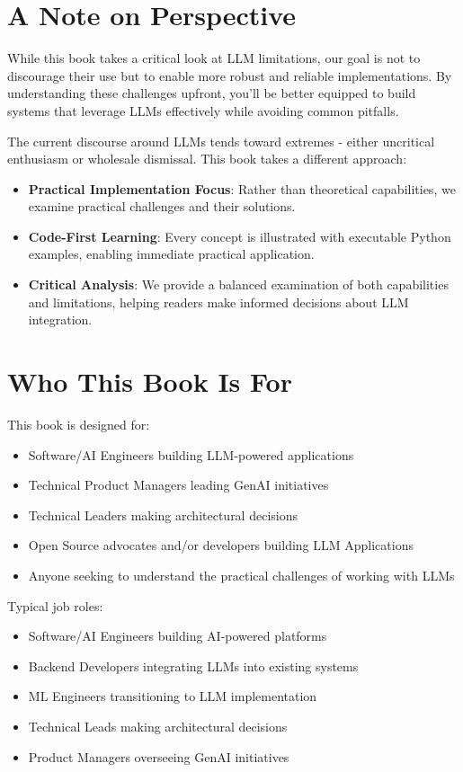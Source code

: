\section{A Note on Perspective}

While this book takes a critical look at LLM limitations, our goal is not to discourage their use but to enable more robust and reliable implementations. By understanding these challenges upfront, you'll be better equipped to build systems that leverage LLMs effectively while avoiding common pitfalls.

The current discourse around LLMs tends toward extremes - either uncritical enthusiasm or wholesale dismissal. This book takes a different approach:

\begin{itemize}
    \item \textbf{Practical Implementation Focus}: Rather than theoretical capabilities, we examine practical challenges and their solutions.
    \item \textbf{Code-First Learning}: Every concept is illustrated with executable Python examples, enabling immediate practical application.
    \item \textbf{Critical Analysis}: We provide a balanced examination of both capabilities and limitations, helping readers make informed decisions about LLM integration.
\end{itemize}

\section{Who This Book Is For}

This book is designed for: 

\begin{itemize}
    \item Software/AI Engineers building LLM-powered applications 
    \item Technical Product Managers leading GenAI initiatives 
    \item Technical Leaders making architectural decisions
    \item Open Source advocates and/or developers building LLM Applications 
    \item Anyone seeking to understand the practical challenges of working with LLMs 
\end{itemize}

Typical job roles:

\begin{itemize}
    \item Software/AI Engineers building AI-powered platforms
    \item Backend Developers integrating LLMs into existing systems
    \item ML Engineers transitioning to LLM implementation
    \item Technical Leads making architectural decisions
    \item Product Managers overseeing GenAI initiatives
\end{itemize}

